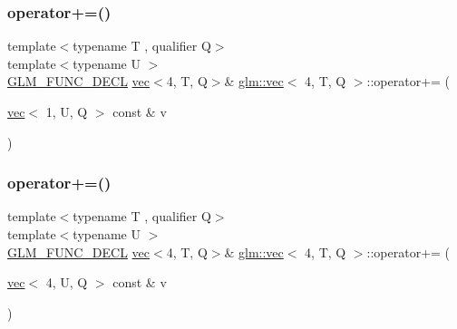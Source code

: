 \subsubsection{\texorpdfstring{operator+=()}{operator+=()}\hspace{0.1cm}{\footnotesize\ttfamily [2/6]}}
{\footnotesize\ttfamily template$<$typename T , qualifier Q$>$ \\
template$<$typename U $>$ \\
\hyperlink{setup_8hpp_ab2d052de21a70539923e9bcbf6e83a51}{G\+L\+M\+\_\+\+F\+U\+N\+C\+\_\+\+D\+E\+CL} \hyperlink{structglm_1_1vec}{vec}$<$4, T, Q$>$\& \hyperlink{structglm_1_1vec}{glm\+::vec}$<$ 4, T, Q $>$\+::operator+= (\begin{DoxyParamCaption}\item[{\hyperlink{structglm_1_1vec}{vec}$<$ 1, U, Q $>$ const \&}]{v }\end{DoxyParamCaption})}

\mbox{\label{structglm_1_1vec_3_014_00_01_t_00_01_q_01_4_a0ecc88837b973bdf129d60381e6e481c}} 
\subsubsection{\texorpdfstring{operator+=()}{operator+=()}\hspace{0.1cm}{\footnotesize\ttfamily [3/6]}}
{\footnotesize\ttfamily template$<$typename T , qualifier Q$>$ \\
template$<$typename U $>$ \\
\hyperlink{setup_8hpp_ab2d052de21a70539923e9bcbf6e83a51}{G\+L\+M\+\_\+\+F\+U\+N\+C\+\_\+\+D\+E\+CL} \hyperlink{structglm_1_1vec}{vec}$<$4, T, Q$>$\& \hyperlink{structglm_1_1vec}{glm\+::vec}$<$ 4, T, Q $>$\+::operator+= (\begin{DoxyParamCaption}\item[{\hyperlink{structglm_1_1vec}{vec}$<$ 4, U, Q $>$ const \&}]{v }\end{DoxyParamCaption})}

\mbox{\label{structglm_1_1vec_3_014_00_01_t_00_01_q_01_4_a96606ae109d8037bfb8ff43c40b25609}} 
